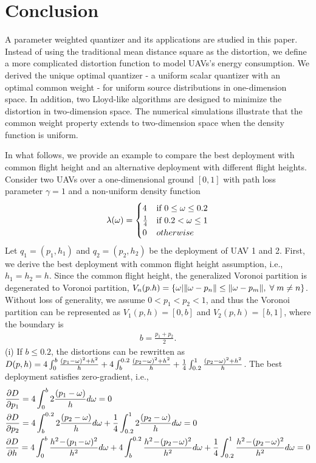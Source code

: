 \documentclass[smallabstract,smallcaptions]{dccpaper}
\newcounter{example}[section]
\begin{document}
\section{Conclusion}
%
A parameter weighted quantizer and its applications are studied in this paper. Instead of using the traditional mean
distance square as the distortion, we define a more complicated distortion function to model UAVs's energy consumption.
We derived the unique optimal quantizer - a uniform scalar quantizer with an optimal common weight - for uniform source
distributions in one-dimension space.  In addition, two Lloyd-like algorithms are designed to minimize the distortion in
two-dimension space.  The numerical simulations illustrate that the common weight property extends to two-dimension
space when the density function is uniform.

In what follows, we provide an example to compare the best deployment with common flight height and an alternative
deployment with different flight heights.  Consider two UAVs over a one-dimensional ground $[0,1]$ with path loss
parameter $\gamma=1$ and a non-uniform density function 
%
\begin{align}
    \lambda(\omega) = 
    \begin{cases}
        4 & \text{if } 0\le\omega\le0.2\\
        \frac{1}{4} & \text{if } 0.2<\omega\le1\\
        0 & otherwise
    \end{cases}
\end{align}
%
Let $q_1=\left(p_1, h_1\right)$ and $q_2=\left(p_2, h_2\right)$ be the deployment of UAV 1 and 2.  First, we derive the
best deployment with common flight height assumption, i.e., $h_1=h_2=h$.  Since the common flight height, the
generalized Voronoi partition is degenerated to Voronoi partition, $V_n(p. h)=\{\ome|\|\ome-p_n\|\le\|\ome-p_m\|,
\forall m\ne n\}$.  Without loss of generality, we assume $0<p_1<p_2<1$, and thus the Voronoi partition can be
represented as $V_1(p, h) = [0, b]$ and $V_2(p, h) = [b, 1]$, where the boundary is 
%
\begin{align}
  b = \frac{p_1+p_2}{2}.\label{boundary}
\end{align}
%
(i) If $b\le0.2$, the distortions can be rewritten as
$D(p,h)=4\int_{0}^{b}\frac{(p_1-\omega)^2+h^2}{h}+4\int_{b}^{0.2}\frac{(p_2-\omega)^2+h^2}{h} +
\frac{1}{4}\int_{0.2}^{1}\frac{(p_2-\omega)^2+h^2}{h}$.  The best deployment satisfies zero-gradient, i.e.,
%
\begin{align}
    &\frac{\partial D}{\partial p_1} = 4\int_{0}^{b}2\frac{(p_1-\ome)}{h}d\ome=0 \label{dp1a}\\
    &\frac{\partial D}{\partial p_2} = 4\int_{b}^{0.2}2\frac{(p_2-\ome)}{h}d\ome
    + \frac{1}{4}\int_{0.2}^{1}2\frac{(p_2-\ome)}{h}d\ome = 0\label{dp2a}\\
    &\frac{\partial D}{\partial h} = 4\int_{0}^{b}\frac{h^2\!-\!(p_1\!-\!\ome)^2}{h^2}d\ome 
    + 4\int_{b}^{0.2}\frac{h^2\!-\!(p_2\!-\!\ome)^2}{h^2}d\ome 
    + \frac{1}{4}\int_{0.2}^1\frac{h^2\!-\!(p_2\!-\!\ome)^2}{h^2}d\ome= 0\notag
\end{align}
\end{document}
